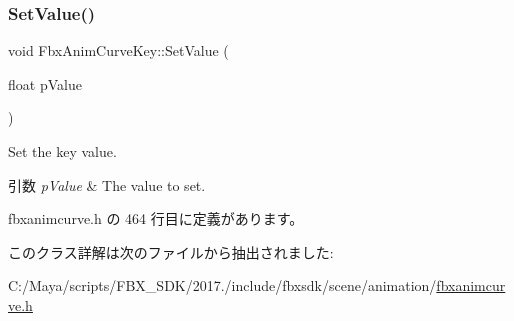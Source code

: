\mbox{\label{class_fbx_anim_curve_key_a4d7ea46fc9d4a6691c5e6d97569c7ae1}} 
\subsubsection{\texorpdfstring{Set\+Value()}{SetValue()}}
{\footnotesize\ttfamily void Fbx\+Anim\+Curve\+Key\+::\+Set\+Value (\begin{DoxyParamCaption}\item[{float}]{p\+Value }\end{DoxyParamCaption})\hspace{0.3cm}{\ttfamily [inline]}}

Set the key value. 
\begin{DoxyParams}{引数}
{\em p\+Value} & The value to set. \\
\hline
\end{DoxyParams}


 fbxanimcurve.\+h の 464 行目に定義があります。



このクラス詳解は次のファイルから抽出されました\+:\begin{DoxyCompactItemize}
\item 
C\+:/\+Maya/scripts/\+F\+B\+X\+\_\+\+S\+D\+K/2017./include/fbxsdk/scene/animation/\hyperlink{fbxanimcurve_8h}{fbxanimcurve.\+h}\end{DoxyCompactItemize}
